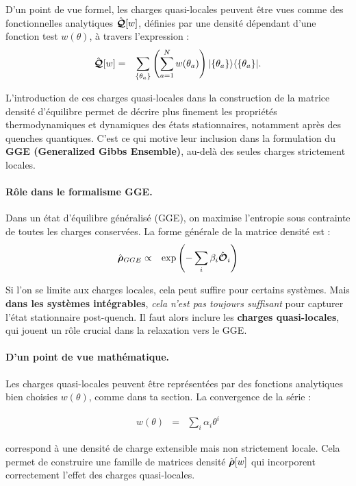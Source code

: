 D’un point de vue formel, les charges quasi-locales peuvent être vues comme des fonctionnelles analytiques $\hat{\bm{\mathcal{Q}}}[w]$, définies par une densité dépendant d’une fonction test $w(\theta)$, à travers l’expression :
\begin{eqnarray*}
	\hat{\bm{\mathcal{Q}}} [w]   & = &  \sum_{\{\theta_a \}} \left ( \sum_{a = 1}^N w ( \theta_a )  \right ) \vert \{ \theta_a \} \rangle \langle \{ \theta_a \} \vert.
\end{eqnarray*}

L’introduction de ces charges quasi-locales dans la construction de la matrice densité d’équilibre permet de décrire plus finement les propriétés thermodynamiques et dynamiques des états stationnaires, notamment après des quenches quantiques. C’est ce qui motive leur inclusion dans la formulation du {\bf GGE (Generalized Gibbs Ensemble)}, au-delà des seules charges strictement locales.

\paragraph{Rôle dans le formalisme GGE.}
Dans un état d'équilibre généralisé (GGE), on maximise l'entropie sous contrainte de toutes les charges conservées. La forme générale de la matrice densité est :
\begin{eqnarray*}
	\hat{\bm{\rho}}_{GGE} & \propto & \exp \left (- \sum_i \beta_i \hat{\bm{\mathcal{O}}}_i  \right) 	
\end{eqnarray*}

Si l’on se limite aux charges locales, cela peut suffire pour certains systèmes. Mais {\bf dans les systèmes intégrables}, {\em cela n’est pas toujours suffisant} pour capturer l'état stationnaire post-quench. Il faut alors inclure les {\bf charges quasi-locales}, qui jouent un rôle crucial dans la relaxation vers le GGE.

\paragraph{D’un point de vue mathématique.} 
Les charges quasi-locales peuvent être représentées par des fonctions analytiques bien choisies $w(\theta)$, comme dans ta section. La convergence de la série :

\begin{eqnarray*}
	w(\theta) & = & \sum_i \alpha_i \theta^i 		
\end{eqnarray*}


correspond à une densité de charge extensible mais non strictement locale. Cela permet de construire une famille de matrices densité $\hat{\bm{\rho}}[w]$ qui incorporent correctement l'effet des charges quasi-locales.
